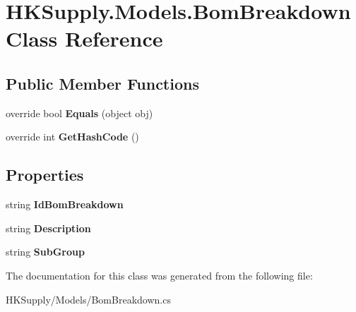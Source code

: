 \hypertarget{class_h_k_supply_1_1_models_1_1_bom_breakdown}{}\section{H\+K\+Supply.\+Models.\+Bom\+Breakdown Class Reference}
\label{class_h_k_supply_1_1_models_1_1_bom_breakdown}
\subsection*{Public Member Functions}
\begin{DoxyCompactItemize}
\item 
\mbox{\label{class_h_k_supply_1_1_models_1_1_bom_breakdown_a1602b18eb008dca3a5da45234893e503}} 
override bool {\bfseries Equals} (object obj)
\item 
\mbox{\label{class_h_k_supply_1_1_models_1_1_bom_breakdown_a9d65c8e248867ca3438d90f75aa85f7f}} 
override int {\bfseries Get\+Hash\+Code} ()
\end{DoxyCompactItemize}
\subsection*{Properties}
\begin{DoxyCompactItemize}
\item 
\mbox{\label{class_h_k_supply_1_1_models_1_1_bom_breakdown_a3a28d18b0de8d1de3fa2d19e59dca840}} 
string {\bfseries Id\+Bom\+Breakdown}
\item 
\mbox{\label{class_h_k_supply_1_1_models_1_1_bom_breakdown_ae5c31b7c0f256340254b5d87f23efd4f}} 
string {\bfseries Description}
\item 
\mbox{\label{class_h_k_supply_1_1_models_1_1_bom_breakdown_ab6b68b2fb615227d7d2965225238cff4}} 
string {\bfseries Sub\+Group}
\end{DoxyCompactItemize}


The documentation for this class was generated from the following file\+:\begin{DoxyCompactItemize}
\item 
H\+K\+Supply/\+Models/Bom\+Breakdown.\+cs\end{DoxyCompactItemize}
